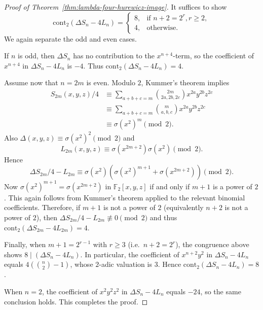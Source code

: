 \documentclass[a4paper]{amsart}
\theoremstyle{plain}
\theoremstyle{definition}
\newcommand{\FF}{\mathbb{F}}
\newcommand{\cont}{\mathrm{cont}}
\renewcommand{\ge}{\geqslant}
\begin{document}
\begin{proof}[Proof of Theorem~\ref{thm:lambda-four-hurewicz-image}]
	It suffices to show
	\[
		\cont_2(\Delta S_n-4L_n)=
		\begin{cases}
			8, & \text{if }n+2=2^{r}, r\ge 2, \\
			4, & \text{otherwise}.
		\end{cases}
	\]
	We again separate the odd and even cases.

	If $n$ is odd, then $\Delta S_n$ has no contribution to the $x^{n+4}$-term, so the coefficient of $x^{n+4}$ in $\Delta S_n-4L_n$ is $-4$.
	Thus $\cont_2(\Delta S_n-4L_n)=4$.

	Assume now that $n=2m$ is even. Modulo $2$, Kummer's theorem implies
	\[
		\begin{aligned}
			S_{2m}(x,y,z)/4
			 & \equiv \sum_{a+b+c=m}\binom{2m}{2a,2b,2c}x^{2a}y^{2b}z^{2c} \\
			 & \equiv \sum_{a+b+c=m}\binom{m}{a,b,c}x^{2a}y^{2b}z^{2c}     \\
			 & \equiv \sigma(x^2)^m \pmod{2}.
		\end{aligned}
	\]
	Also $\Delta(x,y,z)\equiv \sigma(x^2)^2\pmod{2}$ and
	\[
		L_{2m}(x,y,z)\equiv \sigma(x^{2m+2})\sigma(x^2)\pmod{2}.
	\]
	Hence
	\[
		\Delta S_{2m}/4-L_{2m} \equiv \sigma(x^2)\left(\sigma(x^2)^{m+1}+\sigma(x^{2m+2})\right)\pmod{2}.
	\]
	Now $\sigma(x^2)^{m+1}=\sigma(x^{2m+2})$ in $\FF_2[x,y,z]$ if and only if $m+1$ is a power of $2$. This again follows from Kummer's theorem applied to the relevant binomial coefficients. Therefore, if $m+1$ is not a power of $2$ (equivalently $n+2$ is not a power of $2$), then $\Delta S_{2m}/4-L_{2m}\not\equiv 0\pmod{2}$ and thus $\cont_2(\Delta S_{2m}-4L_{2m})=4$.

	Finally, when $m+1=2^{r-1}$ with $r\ge 3$ (i.e.\ $n+2=2^r$), the congruence above shows $8\mid (\Delta S_n-4L_n)$. In particular, the coefficient of $x^{n+2}y^2$ in $\Delta S_n-4L_n$ equals $4\left(\binom{n}{2}-1\right)$, whose $2$-adic valuation is $3$. Hence $\cont_2(\Delta S_n-4L_n)=8$.

	When $n=2$, the coefficient of $x^2y^2z^2$ in $\Delta S_n-4L_n$ equals $-24$, so the same conclusion holds. This completes the proof.
\end{proof}



\end{document}
